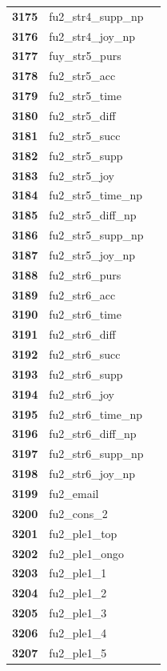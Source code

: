 \documentclass[
  letterpaper,
  DIV=11,
  numbers=noendperiod]{scrartcl}
\begin{document}
\begin{longtable}[t]{>{}cll}
\textbf{3175} & fu2\_str4\_supp\_np & \\
\addlinespace
\textbf{3176} & fu2\_str4\_joy\_np & \\
\textbf{3177} & fuy\_str5\_purs & \\
\textbf{3178} & fu2\_str5\_acc & \\
\textbf{3179} & fu2\_str5\_time & \\
\textbf{3180} & fu2\_str5\_diff & \\
\addlinespace
\textbf{3181} & fu2\_str5\_succ & \\
\textbf{3182} & fu2\_str5\_supp & \\
\textbf{3183} & fu2\_str5\_joy & \\
\textbf{3184} & fu2\_str5\_time\_np & \\
\textbf{3185} & fu2\_str5\_diff\_np & \\
\addlinespace
\textbf{3186} & fu2\_str5\_supp\_np & \\
\textbf{3187} & fu2\_str5\_joy\_np & \\
\textbf{3188} & fu2\_str6\_purs & \\
\textbf{3189} & fu2\_str6\_acc & \\
\textbf{3190} & fu2\_str6\_time & \\
\addlinespace
\textbf{3191} & fu2\_str6\_diff & \\
\textbf{3192} & fu2\_str6\_succ & \\
\textbf{3193} & fu2\_str6\_supp & \\
\textbf{3194} & fu2\_str6\_joy & \\
\textbf{3195} & fu2\_str6\_time\_np & \\
\addlinespace
\textbf{3196} & fu2\_str6\_diff\_np & \\
\textbf{3197} & fu2\_str6\_supp\_np & \\
\textbf{3198} & fu2\_str6\_joy\_np & \\
\textbf{3199} & fu2\_email & \\
\textbf{3200} & fu2\_cons\_2 & \\
\addlinespace
\textbf{3201} & fu2\_ple1\_top & \\
\textbf{3202} & fu2\_ple1\_ongo & \\
\textbf{3203} & fu2\_ple1\_1 & \\
\textbf{3204} & fu2\_ple1\_2 & \\
\textbf{3205} & fu2\_ple1\_3 & \\
\addlinespace
\textbf{3206} & fu2\_ple1\_4 & \\
\textbf{3207} & fu2\_ple1\_5 & \\

\end{longtable}
\end{document}
